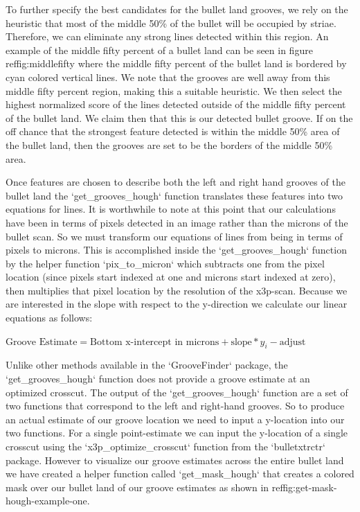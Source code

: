 \documentclass[12pt]{article}\usepackage[]{graphicx}\usepackage[]{color}
\theoremstyle{nonumberplain}
\begin{document}

To further specify the best candidates for the bullet land grooves, we rely on the heuristic that most of the middle 50\% of the bullet will be occupied by striae. Therefore, we can eliminate any strong lines detected within this region. An example of the middle fifty percent of a bullet land can be seen in figure ref{fig:middlefifty} where the middle fifty percent of the bullet land is bordered by cyan colored vertical lines. We note that the grooves are well away from this middle fifty percent region, making this a suitable heuristic. We then select the highest normalized score of the lines detected outside of the middle fifty percent of the bullet land. We claim then that this is our detected bullet groove. If on the off chance that the strongest feature detected is within the middle 50\% area of the bullet land, then the grooves are set to be the borders of the middle 50\% area. 

Once features are chosen to describe both the left and right hand grooves of the bullet land the `get\_grooves\_hough` function translates these features into two equations for lines. It is worthwhile to note at this point that our calculations have been in terms of pixels detected in an image rather than the microns of the bullet scan. So we must transform our equations of lines from being in terms of pixels to microns. This is accomplished inside the `get\_grooves\_hough` function by the helper function `pix\_to\_micron` which subtracts one from the pixel location (since pixels start indexed at one and microns start indexed at zero), then multiplies that pixel location by the resolution of the x3p-scan. Because we are interested in the slope with respect to the y-direction we calculate our linear equations as follows:

\begin{center}
  $\text{Groove Estimate} = \text{Bottom x-intercept in microns} + \text{slope}*y_{i} - \text{adjust}$
\end{center}

 Unlike other methods available in the `GrooveFinder` package, the `get\_grooves\_hough` function does not provide a groove estimate at an optimized crosscut. The output of the  `get\_grooves\_hough` function are a set of two functions that correspond to the left and right-hand grooves. So to produce an actual estimate of our groove location we need to input a y-location into our two functions. For a single point-estimate we can input the y-location of a single crosscut using the `x3p\_optimize\_crosscut` function from the `bulletxtrctr` package. However to visualize our groove estimates across the entire bullet land we have created a helper function called `get\_mask\_hough` that creates a colored mask over our bullet land of our groove estimates as shown in ref{fig:get-mask-hough-example-one}. 
 
\end{document}
